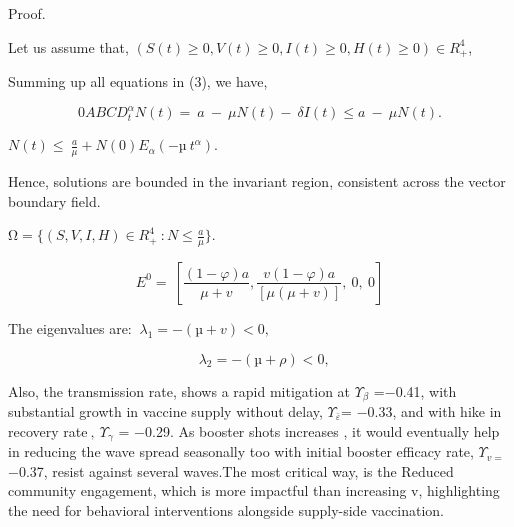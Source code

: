 \documentclass[10pt]{NSP1}
\begin{document}
Proof.

Let us assume that, $\left( S(t) \geq 0,V(t) \geq 0,I(t) \geq 0,H(t) \geq 0 \right) \in R_{+}^{4}$,

Summing up all equations in (3), we have,

\begin{equation}
0ABCD_{t}^{\alpha}N(t) = \ a\  - \ \mu N(t) - \ \delta I(t) \leq a\  - \ \mu N(t).

\end{equation}

$N(t) \leq \ \frac{a}{\mu} + N(0)E_{\alpha}\left( - µ{\ t}^{\alpha} \right)$.

Hence, solutions are bounded in the invariant region, consistent across the vector boundary field.

$\mathrm{\Omega} = \{(S,V,I,H) \in R_{+}^{4}\ :N \leq \frac{a}{\mu}\}$.

\begin{equation}
E^{0} = \ \left\lbrack \frac{(1 - \varphi)a}{\mu + v},\frac{v(1 - \varphi)a}{\left\lbrack \mu(\mu + v) \right\rbrack},\ 0,\ 0 \right\rbrack

\end{equation}

The eigenvalues are: $\ \lambda_{1} = - (µ + v) < 0,$

\begin{equation}
{\ \ \ \lambda}_{2} = - (µ + \rho) < 0,

\end{equation}

Also, the transmission rate, shows a rapid mitigation at $\Upsilon_{\beta}$ =−0.41, with substantial growth in vaccine supply without delay, $\Upsilon_{\bar{\varepsilon}}$= −0.33, and with hike in recovery rate$\ ,\ \Upsilon_{\gamma}$ = −0.29. As booster shots increases , it would eventually help in reducing the wave spread seasonally too with initial booster efficacy rate, $\Upsilon_{v =}$−0.37, resist against several waves.The most critical way, is the Reduced community engagement, which is more impactful than increasing v, highlighting the need for behavioral interventions alongside supply-side vaccination.

\par\vspace{2.4pt}\smallskip

\par\vspace{8.7pt}\smallskip
\end{document}
